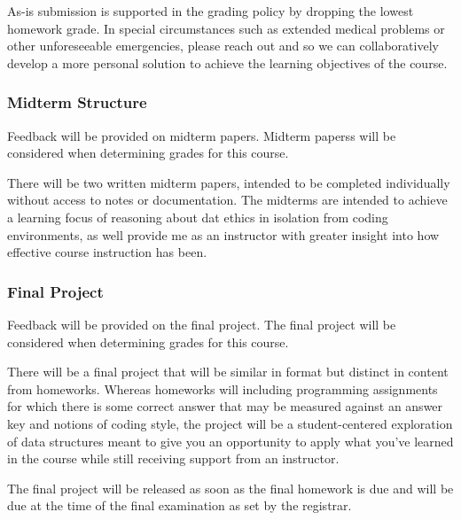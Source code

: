 \documentclass[11pt]{article}
\begin{document}
\bigskip
\noindent As-is submission is supported in the grading policy by dropping the lowest homework
grade. In special circumstances such as extended medical problems or other unforeseeable
emergencies, please reach out and so we can collaboratively develop a more personal
solution to achieve the learning objectives of the course.

\subsubsection*{Midterm Structure}

Feedback will be provided on midterm papers.  Midterm paperss will be considered when determining grades for this course.

\bigskip
\noindent There will be two written midterm papers, intended to be completed individually
without access to notes or documentation. The midterms are intended to achieve a learning
focus of reasoning about dat ethics in isolation from coding environments,
as well provide me as an instructor with greater insight into how effective course
instruction has been.

\subsubsection*{Final Project}

Feedback will be provided on the final project. The final project will be considered when determining grades for this course.


There will be a final project that will be similar in format but distinct in content from
homeworks. Whereas homeworks will including programming assignments for which there is
some correct answer that may be measured against an answer key and notions of coding
style, the project will be a student-centered exploration of data structures meant to
give you an opportunity to apply what you've learned in the course while still receiving
support from an instructor.

\bigskip
\noindent The final project will be released as soon as the final homework is due
 and will be due at the time of the final examination as set 
by the registrar.
\end{document}

